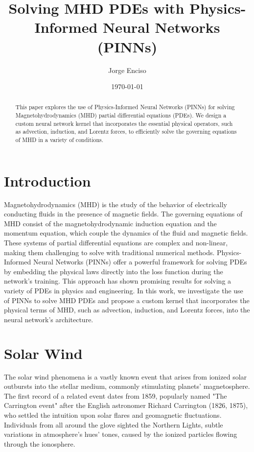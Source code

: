 \documentclass[12pt]{article}
\title{Solving MHD PDEs with Physics-Informed Neural Networks (PINNs)}
\author{Jorge Enciso}
\date{\today}
\begin{document}
\maketitle

\begin{abstract}
This paper explores the use of Physics-Informed Neural Networks (PINNs) for solving Magnetohydrodynamics (MHD) partial differential equations (PDEs). We design a custom neural network kernel that incorporates the essential physical operators, such as advection, induction, and Lorentz forces, to efficiently solve the governing equations of MHD in a variety of conditions.
\end{abstract}

\tableofcontents
\newpage

\section{Introduction}
Magnetohydrodynamics (MHD) is the study of the behavior of electrically conducting fluids in the presence of magnetic fields. The governing equations of MHD consist of the magnetohydrodynamic induction equation and the momentum equation, which couple the dynamics of the fluid and magnetic fields. These systems of partial differential equations are complex and non-linear, making them challenging to solve with traditional numerical methods.
Physics-Informed Neural Networks (PINNs) offer a powerful framework for solving PDEs by embedding the physical laws directly into the loss function during the network's training. This approach has shown promising results for solving a variety of PDEs in physics and engineering. In this work, we investigate the use of PINNs to solve MHD PDEs and propose a custom kernel that incorporates the physical terms of MHD, such as advection, induction, and Lorentz forces, into the neural network's architecture.


\section{Solar Wind}
The solar wind phenomena is a vastly known event that arises from ionized solar outbursts into the stellar medium, commonly stimulating planets' magnetosphere. \cite{Gosling2007} The first record of a related event dates from 1859, popularly named "The Carrington event" after the English astronomer Richard Carrington (1826, 1875), who settled the intuition upon solar flares and geomagnetic fluctuations. Individuals from all around the glove sighted the Northern Lights, subtle variations in atmosphere's hues' tones, caused by the ionized particles flowing through the ionosphere.
\end{document}
